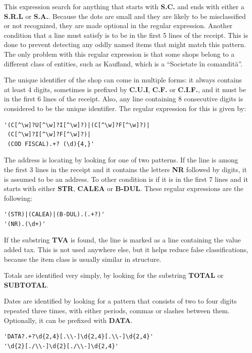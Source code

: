 This expression search for anything that starts with \textbf{S.C.} and ends with either a \textbf{S.R.L} or \textbf{S.A.}. Because the dots are small and they are likely to be misclassified or not recognized, they are made optional in the regular expression. Another condition that a line must satisfy is to be in the first 5 lines of the receipt. This is done to prevent detecting any oddly named items that might match this pattern. The only problem with this regular expression is that some shops belong to a different class of entities, such as Kaufland, which is a ``Societate în comandită''.

The unique identifier of the shop can come in multiple forms: it always contains at least 4 digits, sometimes is prefixed by \textbf{C.U.I}, \textbf{C.F.} or \textbf{C.I.F.}, and it must be in the first 6 lines of the receipt. Also, any line containing 8 consecutive digits is considered to be the unique identifier. The regular expression for this is given by:

\begin{lstlisting}
'(C[^\w]?U[^\w]?I[^\w]?)|(C[^\w]?F[^\w]?)|
 (C[^\w]?I[^\w]?F[^\w]?)|
 (COD FISCAL).+? (\d){4,}'
\end{lstlisting}

The address is locating by looking for one of two patterns. If the line is among the first 3 lines in the receipt and it contains the letters \textbf{NR} followed by digits, it is assumed to be an address. To other condition is if it is in the first 7 lines and it starts with either \textbf{STR}, \textbf{CALEA} or \textbf{B-DUL}. These regular expressions are the following:

\begin{lstlisting}
'(STR)|(CALEA)|(B-DUL).(.+?)'
'(NR).(\d+)'
\end{lstlisting}

If the substring \textbf{TVA} is found, the line is marked as a line containing the value added tax. This is not used anywhere else, but it helps reduce false classifications, because the item class is usually similar in structure. 

Totals are identified very simply, by looking for the substring \textbf{TOTAL} or \textbf{SUBTOTAL}.

Dates are identified by looking for a pattern that consists of two to four digits repeated three times, with either periods, commas or slashes between them. Optionally, it can be prefixed with \textbf{DATA}.

\begin{lstlisting}
'DATA?.+?\d{2,4}[.\\-]\d{2,4}[.\\-]\d{2,4}'
'\d{2}[./\\-]\d{2}[./\\-]\d{2,4}'
\end{lstlisting}

